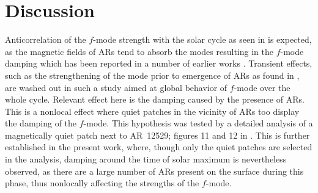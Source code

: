 \documentclass{aa}
\begin{document}
\section{Discussion}

Anticorrelation of the $f$-mode strength with the solar cycle as seen in 
is expected, as the magnetic fields of ARs tend to absorb the modes resulting in the
$f$-mode damping which has been reported in a number of earlier works
\citep{Cally+94,CB97,SRB16}. Transient effects, such as the strengthening of the mode
prior to emergence of ARs as found in \citet{SRB16}, are washed out in such a study aimed
at global behavior of $f$-mode over the whole cycle. Relevant effect here is the damping
caused by the presence of ARs. This is a nonlocal effect where quiet patches in the
vicinity of ARs too display the damping of the $f$-mode. This hypothesis was tested
by a detailed analysis of a magnetically quiet patch next to AR~12529; figures 11 and 12
in \citet{SRB16}. This is further established in the present work, where, though only the
quiet patches are selected in the analysis, damping around the time of solar maximum is
nevertheless observed, as there are a large number of ARs present on the surface during this
phase, thus nonlocally affecting the strengths of the $f$-mode.

\end{document}
